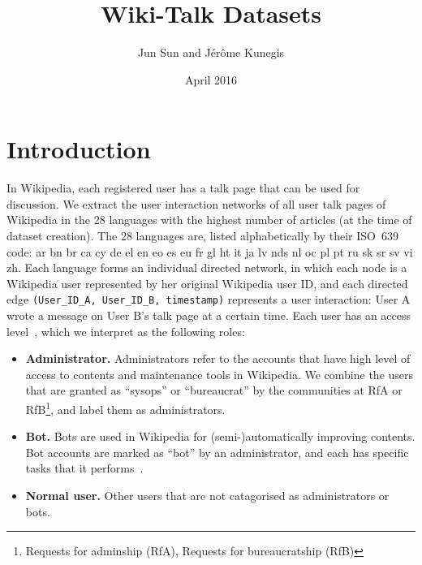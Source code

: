 \documentclass[a4paper]{article}
\begin{document}
\title{Wiki-Talk Datasets}
\author{
    Jun Sun and J\'er\^ome Kunegis
}
\date{April 2016}
\maketitle
{}

\section{Introduction}

In Wikipedia, each registered user has a talk page that can be used for discussion. We extract the user interaction networks of all user talk pages of Wikipedia in the 28 languages with the highest number of articles (at the time of dataset creation). 
The 28 languages are, listed alphabetically by their ISO~639 code: ar bn br ca cy de el en eo es eu fr gl ht it ja lv nds nl oc pl pt ru sk sr sv vi zh.
Each language forms an individual directed network, in which each node is a Wikipedia user represented by her original Wikipedia user ID,
and each directed edge \texttt{(User\_ID\_A, User\_ID\_B, timestamp)} 
represents a user interaction: User A wrote a message on User B's talk page at a certain time.
Each user has an access level~\cite{wiki:accesslevel}, which we interpret as the following roles:
\begin{itemize} 
\item \textbf{Administrator.}
  Administrators refer to the accounts that have high level of access to contents and maintenance tools in Wikipedia. We combine the users that are granted as ``sysops'' or ``bureaucrat'' by the communities at RfA or RfB\footnote{Requests for adminship (RfA), Requests for bureaucratship (RfB)}, and label them as administrators.
\item \textbf{Bot.}
    Bots are used in Wikipedia for (semi-)automatically improving contents. Bot accounts are marked as ``bot'' by an administrator, and each has specific tasks that it  performs~\cite{wiki:botpolicy}.
\item \textbf{Normal user.}
  Other users that are not catagorised as administrators or bots.
\end{itemize}
\end{document}
